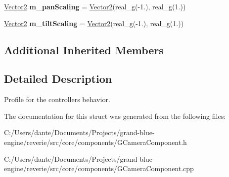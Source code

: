 \begin{DoxyCompactItemize}
\mbox{\label{structrev_1_1_camera_controller_1_1_controller_profile_abc057be34677907f7b252c8154d813bd}} 
\mbox{\hyperlink{classrev_1_1_vector}{Vector2}} {\bfseries m\+\_\+pan\+Scaling} = \mbox{\hyperlink{classrev_1_1_vector}{Vector2}}(real\+\_\+g(-\/1.), real\+\_\+g(1.))
\item 
\mbox{\label{structrev_1_1_camera_controller_1_1_controller_profile_a98989c659e6c59986d4962633cd7c705}} 
\mbox{\hyperlink{classrev_1_1_vector}{Vector2}} {\bfseries m\+\_\+tilt\+Scaling} = \mbox{\hyperlink{classrev_1_1_vector}{Vector2}}(real\+\_\+g(-\/1.), real\+\_\+g(1.))
\end{DoxyCompactItemize}
\subsection*{Additional Inherited Members}


\subsection{Detailed Description}
Profile for the controller\textquotesingle{}s behavior. 

The documentation for this struct was generated from the following files\+:\begin{DoxyCompactItemize}
\item 
C\+:/\+Users/dante/\+Documents/\+Projects/grand-\/blue-\/engine/reverie/src/core/components/G\+Camera\+Component.\+h\item 
C\+:/\+Users/dante/\+Documents/\+Projects/grand-\/blue-\/engine/reverie/src/core/components/G\+Camera\+Component.\+cpp\end{DoxyCompactItemize}
